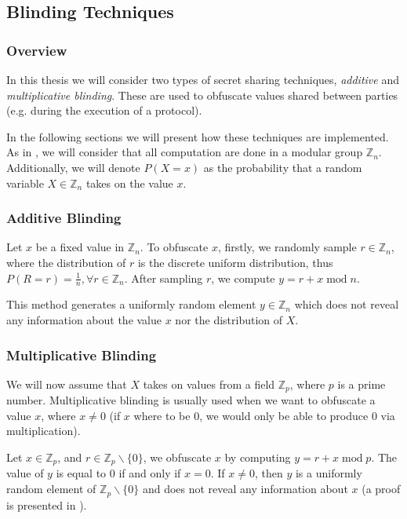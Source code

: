 \subsection{Blinding Techniques}
\label{ch2:sec:blinding-techniques}

\subsubsection{Overview} In this thesis we will consider two types of secret sharing techniques, \emph{additive} and \emph{multiplicative blinding}. These are used to obfuscate values shared between parties (e.g. during the execution of a protocol). 

In the following sections we will present how these techniques are implemented. As in \autocite{Franz2011-sm}, we will consider that all computation are done in a modular group $\mathbb{Z}_n$. Additionally, we will denote $P(X = x)$ as the probability that a random variable $X \in \mathbb{Z}_n$ takes on the value $x$.

\subsubsection{Additive Blinding} 

Let $x$ be a fixed value in $\mathbb{Z}_n$. To obfuscate $x$, firstly, we randomly sample $r \in \mathbb{Z}_n$, where the distribution of $r$ is the discrete uniform distribution, thus $P(R = r) = \frac{1}{n}, \forall r \in \mathbb{Z}_n$. After sampling $r$, we compute $y = r + x \; \textrm{mod} \; n$. 

This method generates a uniformly random element $y \in \mathbb{Z}_n$ which does not reveal any information about the value $x$ nor the distribution of $X$.

\subsubsection{Multiplicative Blinding}

We will now assume that $X$ takes on values from a field $\mathbb{Z}_p$, where $p$ is a prime number. Multiplicative blinding is usually used when we want to obfuscate a value $x$, where $x \neq 0$ (if $x$ where to be 0, we would only be able to produce 0 via multiplication).

Let $x \in \mathbb{Z}_p$, and $r \in \mathbb{Z}_p \backslash \{0\}$, we obfuscate $x$ by computing $y = r + x \; \textrm{mod} \; p$. The value of $y$ is equal to 0 if and only if $x = 0$. If $x \neq 0$, then $y$ is a uniformly random element of $\mathbb{Z}_p \backslash \{0\}$ and does not reveal any information about $x$ (a proof is presented in \autocite{Franz2011-sm}). 

